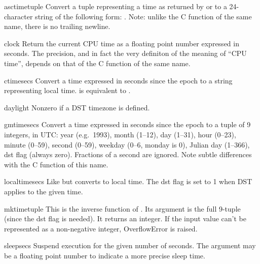\begin{funcdesc}{asctime}{tuple}
Convert a tuple representing a time as returned by  or
 to a 24-character string of the following form:
.  Note: unlike the C function of
the same name, there is no trailing newline.
\end{funcdesc}


\begin{funcdesc}{clock}{}
Return the current CPU time as a floating point number expressed in
seconds.  The precision, and in fact the very definiton of the meaning
of ``CPU time'', depends on that of the C function of the same name.
\end{funcdesc}


\begin{funcdesc}{ctime}{secs}
Convert a time expressed in seconds since the epoch to a string
representing local time.   is equivalent to
.
\end{funcdesc}

\begin{datadesc}{daylight}
Nonzero if a DST timezone is defined.
\end{datadesc}

\begin{funcdesc}{gmtime}{secs}
Convert a time expressed in seconds since the epoch to a tuple of 9
integers, in UTC: year (e.g.\ 1993), month (1--12), day (1--31), hour
(0--23), minute (0--59), second (0--59), weekday (0--6, monday is 0),
Julian day (1--366), dst flag (always zero).  Fractions of a second are
ignored.  Note subtle differences with the C function of this name.
\end{funcdesc}

\begin{funcdesc}{localtime}{secs}
Like  but converts to local time.  The dst flag is set
to 1 when DST applies to the given time.
\end{funcdesc}

\begin{funcdesc}{mktime}{tuple}
This is the inverse function of .  Its argument is the
full 9-tuple (since the dst flag is needed).  It returns an integer.  If the
input value can't be represented as a non-negative integer, OverflowError is raised.
\end{funcdesc}

\begin{funcdesc}{sleep}{secs}
Suspend execution for the given number of seconds.  The argument may
be a floating point number to indicate a more precise sleep time.
\end{funcdesc}

